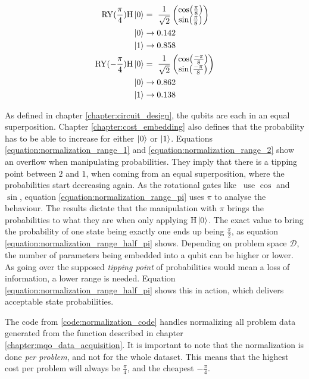 \begin{equation}
    \centering
    \begin{split}
        \mathrm{RY}(\frac{\pi}{4})\mathrm{H}\ket{0} &=\ \frac{1}{\sqrt{2}}\begin{pmatrix}\cos(\frac{\pi}{8}) \\ \sin(\frac{\pi}{8})\end{pmatrix}\\
        \ket{0} &\to 0.142 \\
        \ket{1} &\to 0.858 \\
        \mathrm{RY}(-\frac{\pi}{4})\mathrm{H}\ket{0} &=\ \frac{1}{\sqrt{2}}\begin{pmatrix}\cos(\frac{-\pi}{8}) \\ \sin(\frac{-\pi}{8})\end{pmatrix}\\
        \ket{0} &\to 0.862 \\
        \ket{1} &\to 0.138 \\
    \end{split}
    \label{equation:normalization_range_forth_pi}
\end{equation}

As defined in chapter \ref{chapter:circuit_design}, the qubits are each in an equal superposition. Chapter \ref{chapter:cost_embedding} also defines that the probability has to be able to increase for either $\ket{0}$ or $\ket{1}$. Equations \ref{equation:normalization_range_1} and \ref{equation:normalization_range_2} show an overflow when manipulating probabilities. They imply that there is a tipping point between $2$ and $1$, when coming from an equal superposition, where the probabilities start decreasing again. As the rotational gates like \rygate\ use $\cos$ and $\sin$, equation \ref{equation:normalization_range_pi} uses $\pi$ to analyse the behaviour. The results dictate that the manipulation with $\pi$ brings the probabilities to what they are when only applying $\mathrm{H}\ket{0}$. The exact value to bring the probability of one state being exactly one ends up being $\frac{\pi}{2}$, as equation \ref{equation:normalization_range_half_pi} shows. Depending on problem space $\mathcal{D}$, the number of parameters being embedded into a qubit can be higher or lower. As going over the supposed \emph{tipping point} of probabilities would mean a loss of information, a lower range is needed. Equation \ref{equation:normalization_range_half_pi} shows this in action, which delivers acceptable state probabilities.\par
The code from \ref{code:normalization_code} handles normalizing all problem data generated from the function described in chapter \ref{chapter:mqo_data_acquisition}. It is important to note that the normalization is done \emph{per problem}, and not for the whole dataset. This means that the highest cost per problem will always be $\frac{\pi}{4}$, and the cheapest $-\frac{\pi}{4}$.

